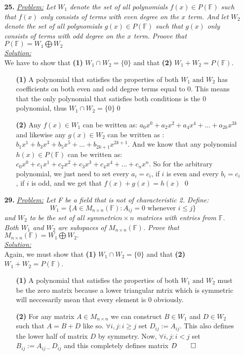 \documentclass[11pt, fleqn]{article}
\begin{document}
\begin{itemize}
    
    \item [\textbf{25.}]\textit{\underline{Problem:} Let $W_1$ denote the set of all polynomials $f(x) \in P(\mathbb{F})$ such that $f(x)$ only consists of terms with even degree on the $x$ term. And let $W_2$ denote the set of all polynomials $g(x) \in P(\mathbb{F})$ such that $g(x)$ only consists of terms with odd degree on the $x$ term. Proove that $P(\mathbb{F}) = W_1 \bigoplus W_2$}\\[2ex]\textit{\underline{Solution:}}\\
    	We have to show that \textbf{(1)} $W_1 \cap W_2 = \{0\}$ and that \textbf{(2)} $W_1 + W_2 = P(\mathbb{F})$.
		\begin{itemize}
			\item[\textbf{(1)}]
    	    	A polynomial that satisfies the properties of both $W_1 \text{ and } W_2$ has coefficients on both even and odd degree terms equal to 0. This means that the only polynomial that satisfies both conditions is the 0 polynomial, thus $W_1 \cap W_2 = \{0\}$\qed
    	    \item[\textbf{(2)}] Any $f(x) \in W_1$ can be written as: $a_0x^0 + a_2x^2 + a_4x^4 + ... + a_{2k}x^{2k}$ and likewise any $g(x) \in W_2$ can be written as : $b_1x^1 + b_3x^3 + b_5x^5 + ... + b_{2k + 1}x^{2k + 1}$. And we know that any polynomial $h(x) \in P(\mathbb{F})$ can be written as: $c_0x^0 + c_1x^1 + c_2x^2 + c_3x^3 + c_4x^4 + ... + c_{n}x^n$. So for the arbitrary polynomial, we just need to set every $a_i = c_i$, if $i$ is even  and every $b_i = c_i$, if $i$ is odd, and we get that $f(x) + g(x) = h(x)$ \qed
    	\end{itemize}    	
    \item [\textbf{29.}]\textit{\underline{Problem:} Let F be a field that is not of characteristic 2. Define: $$W_1 = \{A\in M_{n\times n}(\mathbb{F}): A_{ij} = 0 \text{ whenever } i \leq j \}$$ and $W_2$ to be the set of all symmetric$ n\times n$ matrices with entries from $\mathbb{F}$. Both $W_1$ and $W_2$ are subspaces of $M_{n\times n}(\mathbb{F})$. Prove that $M_{n\times n}(\mathbb{F}) = W_1 \bigoplus W_2.$ }\\[2ex]\textit{\underline{Solution:}}\\
    	Again, we must show that \textbf{(1)} $W_1 \cap W_2 = \{0\}$ and that \textbf{(2)} $W_1 + W_2 = P(\mathbb{F})$.
		\begin{itemize}
			\item[\textbf{(1)}]
    	    	A polynomial that satisfies the properties of both $W_1 \text{ and } W_2$ must be the zero matrix because a lower triangular mtrix which is symmetric will neccesarily mean that every element is 0 obviously.
    	    \item[\textbf{(2)}] For any matrix $A \in M_{n\times n}$ we can construct $B \in W_1$ and $D \in W_2$ such that $A = B + D$ like so. $\forall i,j : i \geq j$ set $D_{ij} := A_{ij}$. This also defines the lower half of matrix $D$ by symmetry. Now, $\forall i,j : i < j$ set $B_{ij} := A_{ij - }D_{ij}$ and this completely defines matrix $D\qed$
	    \end{itemize}
\end{itemize}
\end{document}
